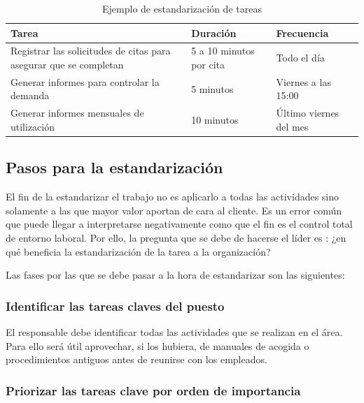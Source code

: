 \begin{table}
    \centering
    \begin{tabular}{p{5cm}ll}
        \toprule
        Tarea                                                             & Duración                & Frecuencia             \\
        \midrule
        Registrar las solicitudes de citas para asegurar que se completan & 5 a 10 minutos por cita & Todo el día            \\
        Generar informes para controlar la demanda                        & 5 minutos               & Viernes a las 15:00    \\
        Generar informes mensuales de utilización                         & 10 minutos              & Último viernes del mes \\
        \bottomrule
    \end{tabular}
    \caption{Ejemplo de estandarización de tareas}
    \label{tab:ejemplo-estandar}
\end{table}

\subsection{Pasos para la estandarización}

El fin de la estandarizar el trabajo no es aplicarlo a todas las actividades sino solamente a las que mayor valor aportan de cara al cliente. Es un error común que puede llegar a interpretarse negativamente como que el fin es el control total de entorno laboral. Por ello, la pregunta que se debe de hacerse el líder es : ¿en qué beneficia la estandarización de la tarea a la organización?

Las fases por las que se debe pasar a la hora de estandarizar son las siguientes:

\subsubsection{Identificar las tareas claves del puesto}

El responsable debe identificar todas las actividades que se realizan en el área.
Para ello será útil aprovechar, si los hubiera, de manuales de acogida o procedimientos antiguos antes de reunirse con los empleados.

\subsubsection{Priorizar las tareas clave por orden de importancia}

